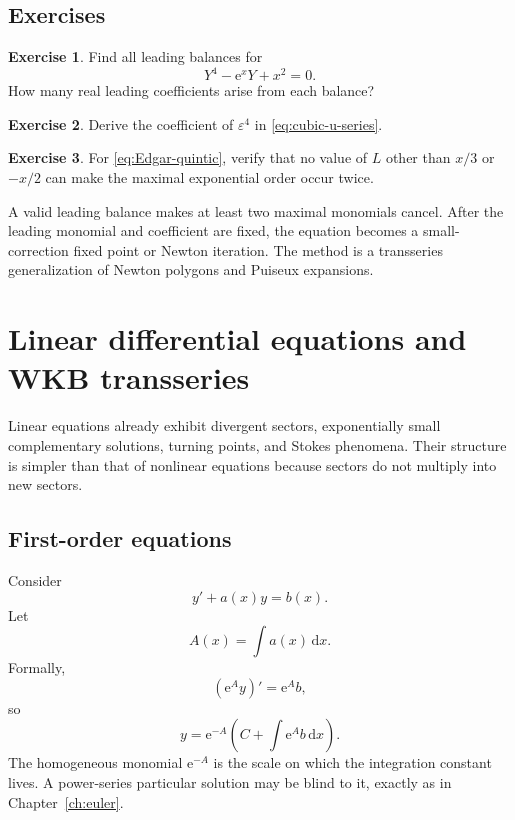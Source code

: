 \documentclass[11pt,openany]{book}
\theoremstyle{definition}
\newtheorem{exercise}{Exercise}[chapter]
\theoremstyle{plain}
\theoremstyle{remark}
\newcommand{\eps}{\varepsilon}
\newcommand{\dd}{\,\mathrm{d}}
\newcommand{\e}{\mathrm{e}}
\begin{document}
\section{Exercises}

\begin{exercise}
Find all leading balances for
\[
 Y^4-\e^xY+x^2=0.
\]
How many real leading coefficients arise from each balance?
\end{exercise}

\begin{exercise}
Derive the coefficient of $\eps^4$ in \cref{eq:cubic-u-series}.
\end{exercise}

\begin{exercise}
For \cref{eq:Edgar-quintic}, verify that no value of $L$ other than $x/3$ or $-x/2$ can make the maximal exponential order occur twice.
\end{exercise}

\begin{summarybox}
A valid leading balance makes at least two maximal monomials cancel. After the leading monomial and coefficient are fixed, the equation becomes a small-correction fixed point or Newton iteration. The method is a transseries generalization of Newton polygons and Puiseux expansions.
\end{summarybox}


\chapter{Linear differential equations and WKB transseries}\label{ch:linear-odes}

Linear equations already exhibit divergent sectors, exponentially small complementary solutions, turning points, and Stokes phenomena. Their structure is simpler than that of nonlinear equations because sectors do not multiply into new sectors.

\section{First-order equations}

Consider
\begin{equation}\label{eq:first-order-linear}
 y'+a(x)y=b(x).
\end{equation}
Let
\[
 A(x)=\int a(x)\dd x.
\]
Formally,
\[
 (\e^A y)'=\e^A b,
\]
so
\begin{equation}\label{eq:first-order-solution}
 y=\e^{-A}\left(C+\int\e^A b\dd x\right).
\end{equation}
The homogeneous monomial $\e^{-A}$ is the scale on which the integration constant lives. A power-series particular solution may be blind to it, exactly as in Chapter~\ref{ch:euler}.
\end{document}
